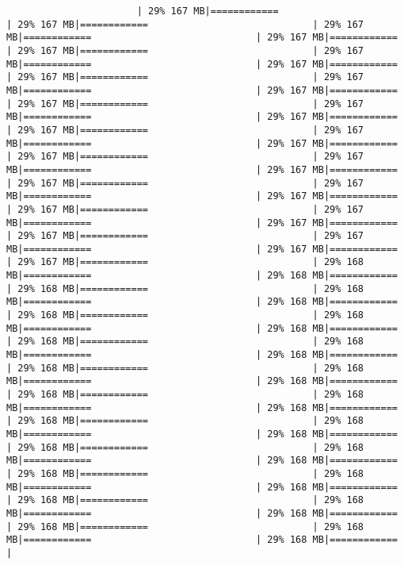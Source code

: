 \documentclass[
]{article}
\begin{document}
\begin{verbatim}
                       | 29% 167 MB|============                             | 29% 167 MB|============                             | 29% 167 MB|============                             | 29% 167 MB|============                             | 29% 167 MB|============                             | 29% 167 MB|============                             | 29% 167 MB|============                             | 29% 167 MB|============                             | 29% 167 MB|============                             | 29% 167 MB|============                             | 29% 167 MB|============                             | 29% 167 MB|============                             | 29% 167 MB|============                             | 29% 167 MB|============                             | 29% 167 MB|============                             | 29% 167 MB|============                             | 29% 167 MB|============                             | 29% 167 MB|============                             | 29% 167 MB|============                             | 29% 167 MB|============                             | 29% 167 MB|============                             | 29% 167 MB|============                             | 29% 167 MB|============                             | 29% 167 MB|============                             | 29% 167 MB|============                             | 29% 167 MB|============                             | 29% 167 MB|============                             | 29% 167 MB|============                             | 29% 167 MB|============                             | 29% 168 MB|============                             | 29% 168 MB|============                             | 29% 168 MB|============                             | 29% 168 MB|============                             | 29% 168 MB|============                             | 29% 168 MB|============                             | 29% 168 MB|============                             | 29% 168 MB|============                             | 29% 168 MB|============                             | 29% 168 MB|============                             | 29% 168 MB|============                             | 29% 168 MB|============                             | 29% 168 MB|============                             | 29% 168 MB|============                             | 29% 168 MB|============                             | 29% 168 MB|============                             | 29% 168 MB|============                             | 29% 168 MB|============                             | 29% 168 MB|============                             | 29% 168 MB|============                             | 29% 168 MB|============                             | 29% 168 MB|============                             | 29% 168 MB|============                             | 29% 168 MB|============                             | 29% 168 MB|============                             | 29% 168 MB|============                             | 29% 168 MB|============                             | 29% 168 MB|============                             | 29% 168 MB|============                             | 29% 168 MB|============                             | 29% 168 MB|============                             | 29% 168 MB|============                             | 
\end{verbatim}
\end{document}
